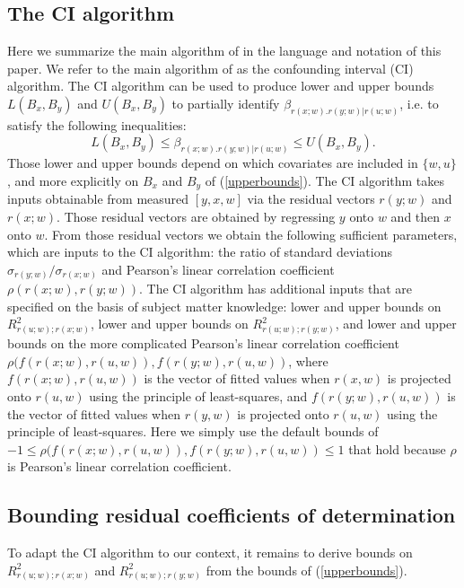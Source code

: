\documentclass[11pt]{amsart}
\begin{document}
\subsection{The CI algorithm}
\label{CI}
Here we summarize the main algorithm of \citep{KOA} in the language and notation of this paper. We refer to the main algorithm of \citep{KOA} as the confounding interval (CI) algorithm. The CI algorithm can be used to produce lower and upper bounds $L(B_x,B_y)$ and $U(B_x,B_y)$ to partially identify $\beta_{r(x;w).r(y;w)|r(u;w)}$, i.e. to satisfy the following inequalities:
\begin{equation}\label{LU}L(B_x,B_y)\leq \beta_{r(x;w).r(y;w)|r(u;w)}\leq U(B_x,B_y).\end{equation}
Those lower and upper bounds depend on which covariates are included in $\{w,u\}$, and more explicitly on $B_x$ and $B_y$ of (\ref{upperbounds}). The CI algorithm takes inputs obtainable from measured $[y,x,w]$ via the residual vectors $r(y;w)$ and $r(x;w)$. Those residual vectors are obtained by regressing $y$ onto $w$ and then $x$ onto $w$. From those residual vectors we obtain the following sufficient parameters, which are inputs to the CI algorithm: the ratio of standard deviations $\sigma_{r(y;w)}/\sigma_{r(x;w)}$ and Pearson's linear correlation coefficient $\rho(r(x;w),r(y;w))$. The CI algorithm has additional inputs that are specified on the basis of subject matter knowledge: lower and upper bounds on $R^2_{r(u;w);r(x;w)}$, lower and upper bounds on $R^2_{r(u;w);r(y;w)}$, and lower and upper bounds on the more complicated Pearson's linear correlation coefficient $\rho(f(r(x;w),r(u,w)),f(r(y;w),r(u,w))$, where $f(r(x;w),r(u,w))$ is the vector of fitted values when $r(x,w)$ is projected onto $r(u,w)$ using the principle of least-squares, and $f(r(y;w),r(u,w))$ is the vector of fitted values when $r(y,w)$ is projected onto $r(u,w)$ using the principle of least-squares. Here we simply use the default bounds of $-1\leq\rho(f(r(x;w),r(u,w)),f(r(y;w),r(u,w))\leq 1$ that hold because $\rho$ is Pearson's linear correlation coefficient.

\subsection{Bounding residual coefficients of determination}
To adapt the CI algorithm to our context, it remains to derive bounds on $R^2_{r(u;w);r(x;w)}$ and  $R^2_{r(u;w);r(y;w)}$ from the bounds of (\ref{upperbounds}). 
\end{document}
